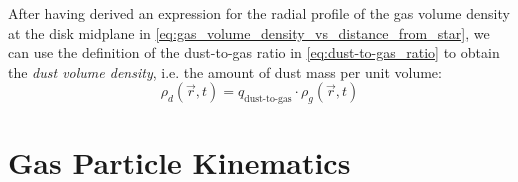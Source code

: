         After having derived an expression for 
        the radial profile of 
        the gas volume density at 
        the disk midplane %
        in \cref{eq:gas_volume_density_vs_distance_from_star}, 
        we can use the definition of 
        the dust-to-gas ratio 
        in \cref{eq:dust-to-gas_ratio}
        to obtain 
        the \textit{dust volume density}, 
        i.e. the amount of dust mass per unit volume:
        \begin{equation}
            \rho_d(\vec r, t) = q_\text{dust-to-gas} \cdot \rho_g(\vec r, t)
        \end{equation}


        \clearpage

        \begin{figure}[h!]
            \caption{}
        \end{figure} 






\clearpage\section{Gas Particle Kinematics}


